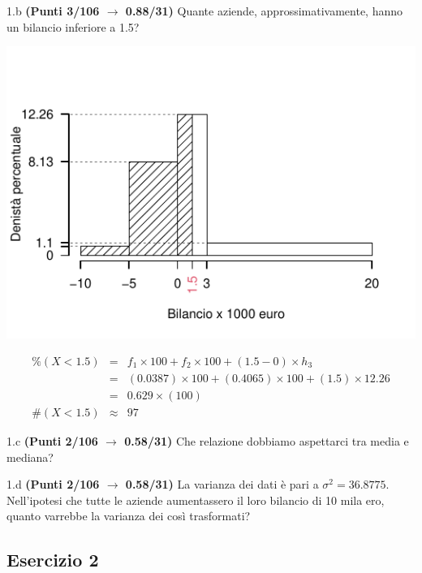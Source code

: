 \documentclass[
  11pt,
]{book}
\theoremstyle{mytheoremstyle}
\theoremstyle{mydefstyle}
\newenvironment{sol}
  {
  \begin{tcolorbox}[enhanced,breakable,arc=0.1mm,boxrule=1pt,colback=white,colframe=iblue,
  title=\bf \fontfamily{lmss}\selectfont \hspace{.5 cm} Soluzione,drop fuzzy shadow]

}{
\end{tcolorbox}
  }
\begin{document}
1.b \textbf{(Punti 3/106 \(\rightarrow\) 0.88/31)} Quante aziende, approssimativamente, hanno un bilancio inferiore a 1.5?

\begin{sol}

\begin{center}\includegraphics{Esami_passati_con_soluzioni_files/figure-latex/2021-34,-1} \end{center}

\begin{eqnarray*}
     \%(X< 1.5 ) &=&  f_{ 1 }\times 100+f_{ 2 }\times 100 +( 1.5 - 0 )\times h_{ 3 } \\
              &=&  ( 0.0387 )\times 100+( 0.4065 )\times 100 +( 1.5 )\times  12.26  \\
              &=&  0.629 \times(100) \\
     \#(X< 1.5 ) &\approx& 97 
         \end{eqnarray*}

\end{sol}

1.c \textbf{(Punti 2/106 \(\rightarrow\) 0.58/31)} Che relazione dobbiamo aspettarci tra media e mediana?

1.d \textbf{(Punti 2/106 \(\rightarrow\) 0.58/31)} La varianza dei dati è pari a \(\sigma^2=36.8775\). Nell'ipotesi che tutte le aziende aumentassero il loro bilancio di 10 mila ero, quanto varrebbe la varianza dei così trasformati?

\subsection{Esercizio 2}\label{esercizio-2-9}
\end{document}
